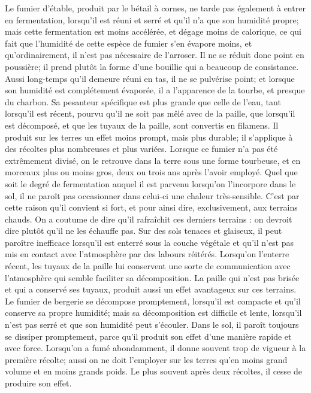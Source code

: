 Le fumier d'étable, produit par le bétail à cornes, ne tarde pas également à entrer en fermentation, lorsqu'il est réuni et serré et qu'il n'a que son humidité propre; mais cette fermentation est moins accélérée, et dégage moins de calorique, ce qui fait que l'humidité de cette espèce de fumier s'en évapore moins, et qu'ordinairement, il n'est pas nécessaire de l'arroser. Il ne se réduit donc point en poussière; il prend plutôt la forme d'une bouillie qui a beaucoup de consistance. Aussi long-temps qu'il demeure réuni en tas, il ne se pulvérise point; et lorsque son humidité est complétement évaporée, il a l'apparence de la tourbe, et presque du charbon. Sa pesanteur spécifique est plus grande que celle de l'eau, tant lorsqu'il est récent, pourvu qu'il ne soit pas mêlé avec de la paille, que lorsqu'il est décomposé, et que les tuyaux de la paille, sont convertis en filamens. Il produit sur les terres un effet moins prompt, mais plus durable; il s'applique à des récoltes plus nombreuses et plus variées. Lorsque ce fumier n'a pas été extrêmement divisé, on le retrouve dans la terre sous une\setcounter{page}{238} forme tourbeuse, et en morceaux plus ou moins gros, deux ou trois ans après l'avoir employé. Quel que soit le degré de fermentation auquel il est parvenu lorsqu'on l'incorpore dans le sol, il ne paroît pas occasionner dans celui-ci une chaleur très-sensible. C'est par cette raison qu'il convient si fort, et pour ainsi dire, exclusivement, aux terrains chauds. On a coutume de dire qu'il rafraîchit ces derniers terrains : on devroit dire plutôt qu'il ne les échauffe pas. Sur des sols tenaces et glaiseux, il peut paroître inefficace lorsqu'il est enterré sous la couche végétale et qu'il n'est pas mis en contact avec l'atmosphère par des labours réitérés. Lorsqu'on l'enterre récent, les tuyaux de la paille lui conservent une sorte de communication avec l'atmosphère qui semble faciliter sa décomposition. La paille qui n'est pas brisée et qui a conservé ses tuyaux, produit aussi un effet avantageux sur ces terrains. Le fumier de bergerie se décompose promptement, lorsqu'il est compacte et qu'il conserve sa propre humidité; mais sa décomposition est difficile et lente, lorsqu'il n'est pas serré et que son humidité peut s'écouler. Dans le sol, il paroît toujours se dissiper promptement, parce qu'il produit son effet d'une manière rapide et avec force. Lorsqu'on a fumé abondamment, il donne\setcounter{page}{239} souvent trop de vigueur à la première récolte; aussi on ne doit l'employer sur les terres qu'en moins grand volume et en moins grands poids. Le plus souvent après deux récoltes, il cesse de produire son effet.
